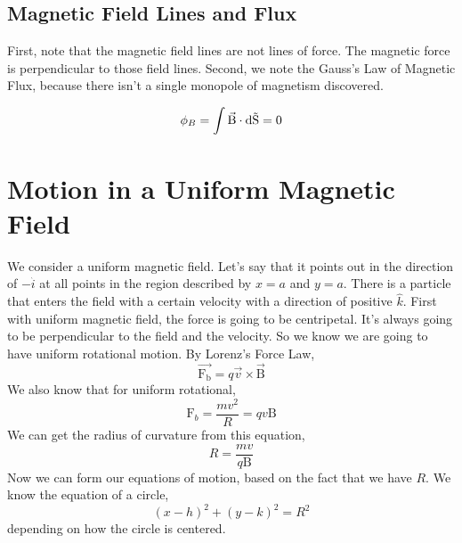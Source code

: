 \pagebreak
\subsection{Magnetic Field Lines and Flux}
First, note that the magnetic field lines are not lines of force. The magnetic force is perpendicular to those field lines. Second, we note the Gauss's Law of Magnetic Flux, because there isn't a single monopole of magnetism discovered.  

\begin{equation*}
	\phi_B = \int \vec{\mathrm{B}} \cdot \mathrm{d\vec{S}} = 0 
\end{equation*}

\section{Motion in a Uniform Magnetic Field}
We consider a uniform magnetic field. Let's say that it points out in the direction of $-\hat{i}$ at all points in the region described by $x=a$ and $y=a$. There is a particle that enters the field with a certain velocity with a direction of positive $\hat{k}$. First with uniform magnetic field, the force is going to be centripetal. It's always going to be perpendicular to the field and the velocity. So we know we are going to have uniform rotational motion. By Lorenz's Force Law,
\begin{equation*}
	\vec{\mathrm{F_b}} = q\vec{v} \times \vec{\mathrm{B}}
\end{equation*}
We also know that for uniform rotational,
\begin{equation*}
	\mathrm{F}_b = \frac{mv^2}{R} = qv\mathrm{B}
\end{equation*}
We can get the radius of curvature from this equation, 
\begin{equation*}
	R = \frac{mv}{q\mathrm{B}}
\end{equation*}	
Now we can form our equations of motion, based on the fact that we have $R$. We know the equation of a circle, 
\begin{equation*}
	(x-h)^2 + (y-k)^2 = R^2
\end{equation*}
depending on how the circle is centered.

